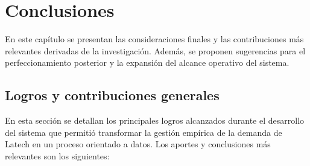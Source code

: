 
\chapter{Conclusiones} %

\label{Chapter5} %

En este capítulo se presentan las consideraciones finales y las contribuciones más relevantes derivadas de la investigación. Además, se proponen sugerencias para el perfeccionamiento posterior y la expansión del alcance operativo del sistema.

\section{Logros y contribuciones generales}

En esta sección se detallan los principales logros alcanzados durante el desarrollo del sistema que permitió transformar la gestión empírica de la demanda de Latech en un proceso orientado a datos. Los aportes y conclusiones más relevantes son los siguientes:

